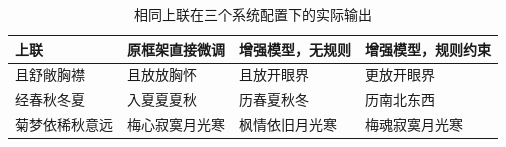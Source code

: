\begin{table}[htbp]
\centering\small
\caption{相同上联在三个系统配置下的实际输出}\label{tab:three_stages}
\begin{tabularx}{\linewidth}{L{3.1cm}YYY}
\toprule 上联&原框架直接微调&增强模型，无规则&增强模型，规则约束\\\midrule
且舒敞胸襟&且放放胸怀&且放开眼界&更放开眼界\\
经春秋冬夏&入夏夏夏秋&历春夏秋冬&历南北东西\\
菊梦依稀秋意远&梅心寂寞月光寒&枫情依旧月光寒&梅魂寂寞月光寒\\
\bottomrule
\end{tabularx}
\end{table}
